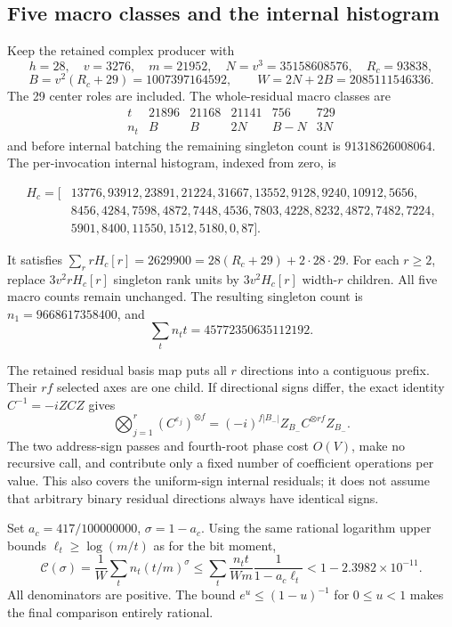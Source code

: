 \subsection{Five macro classes and the internal histogram}
Keep the retained complex producer with
\[
 h=28,\quad v=3276,\quad m=21952,\quad N=v^3=35158608576,
 \quad R_c=93838,
\]
\[
 B=v^2(R_c+29)=1007397164592,\qquad
 W=2N+2B=2085111546336.
\]
The 29 center roles are included. The whole-residual macro classes are
\[
\begin{array}{c|rrrrr}
 t&21896&21168&21141&756&729\\\hline
 n_t&B&B&2N&B-N&3N
\end{array}
\]
and before internal batching the remaining singleton count is
$91318626008064$. The per-invocation internal histogram, indexed from
zero, is
\begin{small}\begin{align*}
 H_c=[&13776,93912,23891,21224,31667,13552,9128,9240,10912,5656,\\
 &8456,4284,7598,4872,7448,4536,7803,4228,8232,4872,7482,7224,\\
 &5901,8400,11550,1512,5180,0,87].
\end{align*}\end{small}
It satisfies $\sum_r rH_c[r]=2629900=28(R_c+29)+2\cdot28\cdot29$.
For each $r\ge2$, replace $3v^2rH_c[r]$ singleton rank units by
$3v^2H_c[r]$ width-$r$ children. All five macro counts remain unchanged.
The resulting singleton count is $n_1=9668617358400$, and
\[
 \sum_tn_tt=45772350635112192.
\]

The retained residual basis map puts all $r$ directions into a contiguous
prefix. Their $rf$ selected axes are one child. If directional signs
differ, the exact identity $C^{-1}=-iZCZ$ gives
\[
 \bigotimes_{j=1}^r(C^{\varepsilon_j})^{\otimes f}
   =(-i)^{f|B_-|}Z_{B_-}C^{\otimes rf}Z_{B_-}.
\]
The two address-sign passes and fourth-root phase cost $O(V)$, make no
recursive call, and contribute only a fixed number of coefficient
operations per value. This also covers the uniform-sign internal
residuals; it does not assume that arbitrary binary residual directions
always have identical signs.

Set $a_c=417/100000000$, $\sigma=1-a_c$. Using the same rational
logarithm upper bounds $\ell_t\ge\log(m/t)$ as for the bit moment,
\[
 \mathcal C(\sigma)=\frac1W\sum_t n_t(t/m)^\sigma
 \le\sum_t\frac{n_tt}{Wm}\frac1{1-a_c\ell_t}
 <1-2.3982\times10^{-11}.
\]
All denominators are positive. The bound $e^u\le(1-u)^{-1}$ for
$0\le u<1$ makes the final comparison entirely rational.

